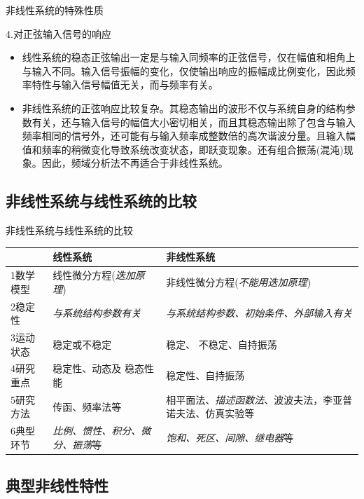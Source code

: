 \documentclass[handout,cjkutf8,table,aspectratio=1610]{beamer} %
\begin{document}
\begin{frame}{非线性系统的特殊性质}
	\begin{block}{4.对正弦输入信号的响应}
		\begin{itemize}
			\item 线性系统的稳态正弦输出一定是与输入同频率的正弦信号，仅在幅值和相角上与输入不同。输入信号振幅的变化，仅使输出响应的振幅成比例变化，因此频率特性与输入信号幅值无关，而与频率有关。
			\item 非线性系统的正弦响应比较复杂。其稳态输出的波形不仅与系统自身的结构参数有关，还与输入信号的幅值大小密切相关，而且其稳态输出除了包含与输入频率相同的信号外，还可能有与输入频率成整数倍的高次谐波分量。且输入幅值和频率的稍微变化导致系统改变状态，即跃变现象。还有组合振荡(混沌)现象。因此，频域分析法不再适合于非线性系统。
		\end{itemize}
	\end{block}
\end{frame}

\subsection{非线性系统与线性系统的比较}
\begin{frame}{非线性系统与线性系统的比较}
	\begin{tabular}{p{}p{}p{}}
	\toprule
		&线性系统&非线性系统\\\midrule
1数学模型&线性微分方程(\emph{迭加原理})&非线性微分方程(\emph{不能用迭加原理})\\
2稳定性&\emph{与系统结构参数有关}&\emph{与系统结构参数、初始条件、外部输入有关}\\
3运动状态&稳定或不稳定&稳定、 不稳定、自持振荡\\
4研究重点&稳定性、动态及 稳态性能&稳定性、自持振荡\\
5研究方法&传函、频率法等&相平面法、\emph{描述函数法}、波波夫法，李亚普诺夫法、仿真实验等\\
6典型环节&\emph{比例、惯性、积分、微分、振荡}等&\emph{饱和、死区、间隙、继电器}等\\\bottomrule
	\end{tabular}
\end{frame}

\subsection{典型非线性特性}
\end{document}

